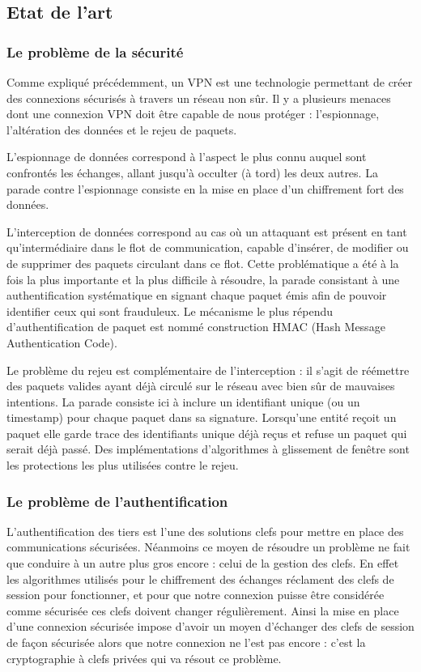 \subsection{Etat de l'art}

\subsubsection{Le problème de la sécurité}

Comme expliqué précédemment, un VPN est une technologie permettant de créer des connexions sécurisés à travers un réseau non sûr. Il y a plusieurs menaces dont une connexion VPN doit être capable de nous protéger : l'espionnage, l'altération des données et le rejeu de paquets.

L'espionnage de données correspond à l'aspect le plus connu auquel sont confrontés les échanges, allant jusqu'à occulter (à tord) les deux autres. La parade contre l'espionnage consiste en la mise en place d'un chiffrement fort des données.

L'interception de données correspond au cas où un attaquant est présent en tant qu'intermédiaire dans le flot de communication, capable d'insérer, de modifier ou de supprimer des paquets circulant dans ce flot. Cette problématique a été à la fois la plus importante et la plus difficile à résoudre, la parade consistant à une authentification systématique en signant chaque paquet émis afin de pouvoir identifier ceux qui sont frauduleux. Le mécanisme le plus répendu d'authentification de paquet est nommé construction HMAC (Hash Message Authentication Code).

Le problème du rejeu est complémentaire de l'interception : il s'agit de réémettre des paquets valides ayant déjà circulé sur le réseau avec bien sûr de mauvaises intentions. La parade consiste ici à inclure un identifiant unique (ou un timestamp) pour chaque paquet dans sa signature. Lorsqu'une entité reçoit un paquet elle garde trace des identifiants unique déjà reçus et refuse un paquet qui serait déjà passé. Des implémentations d'algorithmes à glissement de fenêtre sont les protections les plus utilisées contre le rejeu.

\subsubsection{Le problème de l'authentification}

L'authentification des tiers est l'une des solutions clefs pour mettre en place des communications sécurisées. Néanmoins ce moyen de résoudre un problème ne fait que conduire à un autre plus gros encore : celui de la gestion des clefs. En effet les algorithmes utilisés pour le chiffrement des échanges réclament des clefs de session pour fonctionner, et pour que notre connexion puisse être considérée comme sécurisée ces clefs doivent changer régulièrement. Ainsi la mise en place d'une connexion sécurisée impose d'avoir un moyen d'échanger des clefs de session de façon sécurisée alors que notre connexion ne l'est pas encore : c'est la cryptographie à clefs privées qui va résout ce problème.



